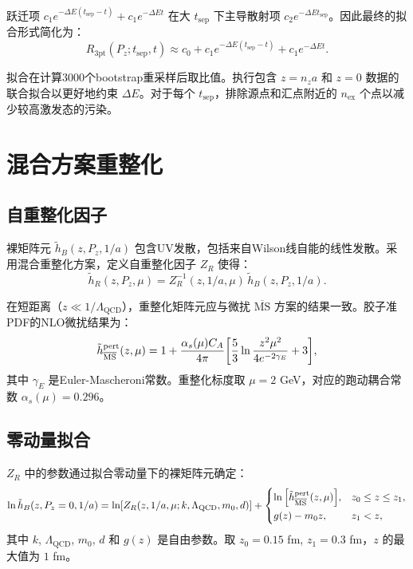 \documentclass[11pt,a4paper]{article}
\newcommand{\MS}{\overline{\text{MS}}}
\newcommand{\hB}{\tilde{h}_B}
\newcommand{\hR}{\tilde{h}_R}
\newcommand{\hpert}{\tilde{h}^{\text{pert}}}
\newcommand{\tsep}{t_{\text{sep}}}
\newcommand{\Pz}{P_z}
\newcommand{\QCD}{\Lambda_{\text{QCD}}}
\newcommand{\alphas}{\alpha_s}
\newcommand{\CA}{C_A}
\begin{document}
跃迁项 $c_1 e^{-\Delta E(\tsep - t)} + c_1 e^{-\Delta E t}$ 在大 $\tsep$ 下主导散射项 $c_2 e^{-\Delta E \tsep}$。因此最终的拟合形式简化为：
\begin{equation}\label{eq:ratio_fit_simple}
    R_{3\text{pt}}(\Pz; \tsep, t) \approx c_0 + c_1 e^{-\Delta E(\tsep - t)} + c_1 e^{-\Delta E t}.
\end{equation}

拟合在计算3000个bootstrap重采样后取比值。执行包含 $z = n_z a$ 和 $z = 0$ 数据的联合拟合以更好地约束 $\Delta E$。对于每个 $\tsep$，排除源点和汇点附近的 $n_{\text{ex}}$ 个点以减少较高激发态的污染。

\section{混合方案重整化}

\subsection{自重整化因子}

裸矩阵元 $\hB(z, \Pz, 1/a)$ 包含UV发散，包括来自Wilson线自能的线性发散。采用混合重整化方案\cite{Ji:2020brr}，定义自重整化因子 $Z_R$ 使得：
\begin{equation}\label{eq:ZR}
    \hR(z, \Pz, \mu) = Z_R^{-1}(z, 1/a, \mu) \, \hB(z, \Pz, 1/a).
\end{equation}

在短距离（$z \ll 1/\QCD$），重整化矩阵元应与微扰 $\MS$ 方案的结果一致。胶子准PDF的NLO微扰结果为：
\begin{equation}\label{eq:hpert}
    \hpert_{\MS}(z, \mu) = 1 + \frac{\alphas(\mu) \CA}{4\pi} \qty[\frac{5}{3} \ln\frac{z^2\mu^2}{4e^{-2\gamma_E}} + 3],
\end{equation}
其中 $\gamma_E$ 是Euler-Mascheroni常数。重整化标度取 $\mu = 2$ GeV，对应的跑动耦合常数 $\alphas(\mu) = 0.296$。

\subsection{零动量拟合}

$Z_R$ 中的参数通过拟合零动量下的裸矩阵元确定：
\begin{equation}\label{eq:ZR_fit}
    \ln \hB(z, \Pz = 0, 1/a) = \ln[Z_R(z, 1/a, \mu; k, \QCD, m_0, d)] + \begin{cases}
        \ln\qty[\hpert_{\MS}(z, \mu)], & z_0 \leq z \leq z_1,\\[4pt]
        g(z) - m_0 z, & z_1 < z,
    \end{cases}
\end{equation}
其中 $k$, $\QCD$, $m_0$, $d$ 和 $g(z)$ 是自由参数。取 $z_0 = 0.15$ fm, $z_1 = 0.3$ fm，$z$ 的最大值为 $1$ fm。
\end{document}
